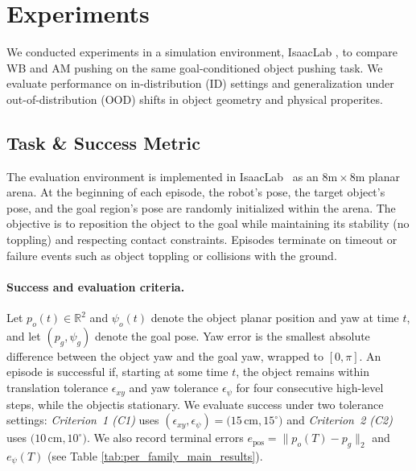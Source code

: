 

\section{Experiments}
\label{sec:exp_results}


We conducted experiments in a simulation environment, IsaacLab \cite{Baginski2025IsaacLab}, to compare %
WB and AM
pushing on the same goal-conditioned object pushing task. We evaluate performance on in-distribution (ID) settings and generalization under out-of-distribution (OOD) shifts in object geometry and physical properites. %

\subsection{Task \& Success Metric}
\label{sec:mdp}
The evaluation environment is implemented in IsaacLab~\cite{Baginski2025IsaacLab} as an $8\mathrm{m} \times 8\mathrm{m}$ planar arena. At the beginning of each episode, the robot's pose, the target object's pose, and the goal region's pose are randomly initialized within the arena. The objective is to reposition the object to the goal while maintaining its stability (no toppling) and respecting contact constraints. Episodes terminate on timeout or failure events such as object toppling or collisions with the ground.

\paragraph{Success and evaluation criteria.}
Let $p_o(t)\in\mathbb{R}^2$ and $\psi_o(t)$ denote the object planar position and yaw at time $t$, and let $(p_g,\psi_g)$ denote the goal pose. Yaw error is the smallest absolute difference between the object yaw and the goal yaw, wrapped to $[0,\pi]$. An episode is successful if, starting at some time $t$, the object remains within translation tolerance $\epsilon_{xy}$ and yaw tolerance $\epsilon_\psi$ for four consecutive high-level steps, while the objectis stationary. We evaluate success under two tolerance settings: \textit{Criterion~1 (C1)} uses $(\epsilon_{xy},\epsilon_\psi)=(15$\,cm$,15^\circ)$ and \textit{Criterion~2 (C2)} uses $(10$\,cm$,10^\circ)$. We also record terminal errors $e_{\text{pos}}=\|p_o(T)-p_g\|_2$ and $e_{\psi}(T)$ (see Table \ref{tab:per_family_main_results}).




